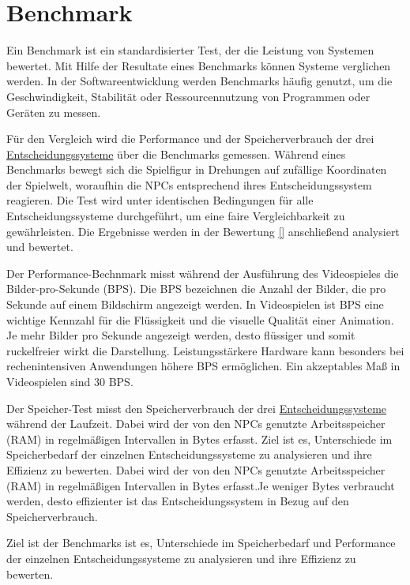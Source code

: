 \section{Benchmark}
\label{chap:benchmark}

Ein Benchmark ist ein standardisierter Test, der die Leistung von Systemen bewertet. Mit Hilfe der Resultate eines Benchmarks k\"{o}nnen Systeme verglichen werden. In der Softwareentwicklung werden Benchmarks h\"{a}ufig genutzt, um die Geschwindigkeit, Stabilit\"{a}t oder Ressourcennutzung von Programmen oder Ger\"{a}ten zu messen.

F\"{u}r den Vergleich wird die Performance und der Speicherverbrauch der drei \hyperref[chap:entscheidungssysteme]{Entscheidungssysteme} \"{u}ber die Benchmarks gemessen. W\"{a}hrend eines Benchmarks bewegt sich die Spielfigur in Drehungen auf zuf\"{a}llige Koordinaten der Spielwelt, woraufhin die NPCs entsprechend ihres Entscheidungssystem reagieren. Die Test wird unter identischen Bedingungen f\"{u}r alle Entscheidungssysteme durchgef\"{u}hrt, um eine faire Vergleichbarkeit zu gew\"{a}hrleisten. Die Ergebnisse werden in der Bewertung \ref{} anschlie\ss{}end analysiert und bewertet.

Der Performance-Bechnmark misst w\"{a}hrend der Ausf\"{u}hrung des Videospieles die Bilder-pro-Sekunde (BPS). Die BPS bezeichnen die Anzahl der Bilder, die pro Sekunde auf einem Bildschirm angezeigt werden. In Videospielen ist BPS eine wichtige Kennzahl f\"{u}r die Fl\"{u}ssigkeit und die visuelle Qualit\"{a}t einer Animation. Je mehr Bilder pro Sekunde angezeigt werden, desto fl\"{u}ssiger und somit ruckelfreier wirkt die Darstellung. Leistungsst\"{a}rkere Hardware kann besonders bei rechenintensiven Anwendungen h\"{o}here BPS erm\"{o}glichen. Ein akzeptables Ma\ss{} in Videospielen sind 30 BPS.

Der Speicher-Test misst den Speicherverbrauch der drei \hyperref[chap:entscheidungssysteme]{Entscheidungssysteme} w\"{a}hrend der Laufzeit. Dabei wird der von den NPCs genutzte Arbeitsspeicher (RAM) in regelm\"{a}\ss{}igen Intervallen in Bytes erfasst. Ziel ist es, Unterschiede im Speicherbedarf der einzelnen Entscheidungssysteme zu analysieren und ihre Effizienz zu bewerten. Dabei wird der von den NPCs genutzte Arbeitsspeicher (RAM) in regelm\"{a}\ss{}igen Intervallen in Bytes erfasst.Je weniger Bytes verbraucht werden, desto effizienter ist das Entscheidungssystem in Bezug auf den Speicherverbrauch.

Ziel ist der Benchmarks ist es, Unterschiede im Speicherbedarf und Performance der einzelnen Entscheidungssysteme zu analysieren und ihre Effizienz zu bewerten.